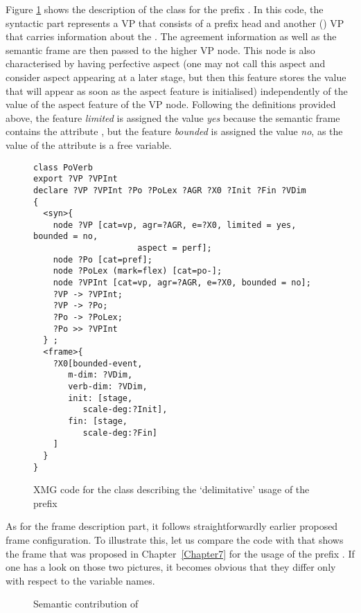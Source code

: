 Figure \ref{code:po} shows the  description of the class for the prefix . In this code, the syntactic part represents a VP that consists of a prefix head and another () VP that carries information about the . The agreement information as well as the semantic frame are then passed to the higher VP node. This node is also characterised by having perfective aspect (one may not call this aspect and consider aspect appearing at a later stage, but then this feature stores the value that will appear as soon as the aspect feature is initialised) independently of the value of the aspect feature of the  VP node. Following the definitions provided above, the feature \textit{limited} is assigned the value \textit{yes} because the semantic frame contains the attribute \FIN, but the feature \textit{bounded} is assigned the value \textit{no}, as the value of the attribute \FIN is a free variable.

\begin{figure}
\begin{lstlisting}[style=xmg]
class PoVerb
export ?VP ?VPInt
declare ?VP ?VPInt ?Po ?PoLex ?AGR ?X0 ?Init ?Fin ?VDim
{
  <syn>{
    node ?VP [cat=vp, agr=?AGR, e=?X0, limited = yes, bounded = no, 
    				 aspect = perf];
    node ?Po [cat=pref];
    node ?PoLex (mark=flex) [cat=po-];
    node ?VPInt [cat=vp, agr=?AGR, e=?X0, bounded = no];
    ?VP -> ?VPInt;
    ?VP -> ?Po;
    ?Po -> ?PoLex;
    ?Po >> ?VPInt
  } ;
  <frame>{
    ?X0[bounded-event,
       m-dim: ?VDim,
       verb-dim: ?VDim,
       init: [stage, 
          scale-deg:?Init],
       fin: [stage, 
          scale-deg:?Fin]    
    ]
  }
}
\end{lstlisting}
\caption{XMG code for the class describing the `delimitative' usage of the prefix \label{code:po}}
\end{figure}

As for the frame description part, it follows straightforwardly earlier proposed frame configuration. To illustrate this, let us compare the code with  that shows the frame that was proposed in Chapter~\ref{Chapter7} for the  usage of the prefix . If one has a look on those two pictures, it becomes obvious that they differ only with respect to the variable names. 

\begin{figure}
\caption{Semantic contribution of \label{frame:po:delim:rep}}
\end{figure}

